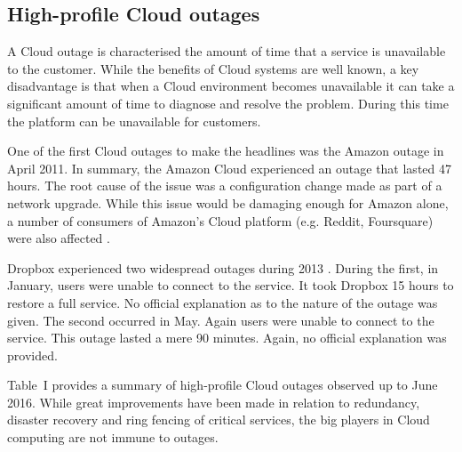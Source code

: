 \documentclass[5p]{elsarticle}
\begin{document}
\subsection{High-profile Cloud outages}
A Cloud outage is characterised the amount of time that a service is unavailable to the customer. While the benefits of Cloud systems are well known, a key disadvantage is that when a Cloud environment becomes unavailable it can take a significant amount of time to diagnose and resolve the problem. During this time the platform can be unavailable for customers.

One of the first Cloud outages to make the headlines was the Amazon outage in April 2011. In summary, the Amazon Cloud experienced an outage that lasted 47 hours. The root cause of the issue was a configuration change made as part of a network upgrade. While this issue would be damaging enough for Amazon alone, a number of consumers of Amazon's Cloud platform (e.g. Reddit, Foursquare) were also affected \cite{InfoWorld2015outage}. 

Dropbox experienced two widespread outages during 2013 \cite{Talbot013DBoutage, Etherington2013DBoutage}. During the first, in January, users were unable to connect to the service. It took Dropbox 15 hours to restore a full service. No official explanation as to the nature of the outage was given. The second occurred in May. Again users were unable to connect to the service. This outage lasted a mere 90 minutes. Again, no official explanation was provided.

Table~I provides a summary of high-profile Cloud outages observed up to June 2016\cite{CRN2016outage}. While great improvements have been made in relation to redundancy, disaster recovery and ring fencing of critical services, the big players in Cloud computing are not immune to outages.
\end{document}
